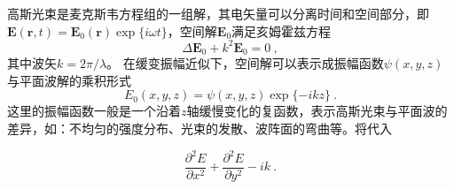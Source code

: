 
\begin{issues}
\issueDraft
\end{issues}


高斯光束是麦克斯韦方程组的一组解，其电矢量可以分离时间和空间部分，即$\boldsymbol E(\boldsymbol r,t)=\boldsymbol E_0(\boldsymbol r)\exp\{i\omega t\}$，空间解$\boldsymbol  E_0$满足亥姆霍兹方程
\begin{equation}
\Delta \boldsymbol E_0 + k^2 \boldsymbol E_0=0~,
\end{equation}
其中波矢$k=2\pi/\lambda$。
在缓变振幅近似下，空间解可以表示成振幅函数$\psi(x,y,z)$与平面波解的乘积形式
\begin{equation}\label{eq_FMGB_2}
E_0(x,y,z) = \psi(x,y,z)\exp\{-ikz\}~.
\end{equation}
这里的振幅函数一般是一个沿着$z$轴缓慢变化的复函数，表示高斯光束与平面波的差异，如：不均匀的强度分布、光束的发散、波阵面的弯曲等。将代入
 


\begin{equation}\label{eq_FMGB_1}
\frac{\partial^2 E}{\partial x^2} +\frac{\partial^2 E}{\partial y^2} -ik ~.
\end{equation}

